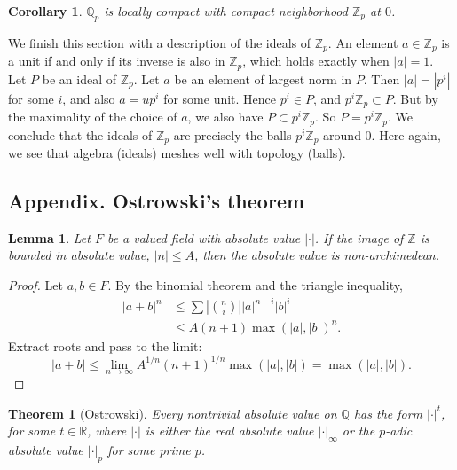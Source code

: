 \documentclass{amsart}
\newcommand{\ring}[1]{\mathbb{#1}}
\newtheorem{theorem}[equation]{Theorem}
\newtheorem{lemma}[equation]{Lemma}
\newtheorem{corollary}[equation]{Corollary}
\def\abs#1{{|#1|}}
\begin{document}
\begin{corollary} $\ring{Q}_p$ is locally compact with compact neighborhood $\ring{Z}_p$
at $0$.
\end{corollary}

We finish this section with a description of the ideals of $\ring{Z}_p$.
An element $a\in\ring{Z}_p$ is a unit if and only if its inverse is also in $\ring{Z}_p$,
which holds exactly when $\abs{a}=1$.   Let $P$ be an ideal of $\ring{Z}_p$.  Let
$a$ be an element of largest norm in $P$.  Then $\abs{a}=\abs{p^i}$ for some $i$, and
also $a = u p^i$ for some unit.  Hence $p^i \in P$, and $p^i\ring{Z}_p\subset P$.  But
by the maximality of the choice of $a$, we also have $P\subset p^i\ring{Z}_p$.  
So $P=p^i\ring{Z}_p$.  We conclude that the ideals of $\ring{Z}_p$ are precisely
the balls $p^i\ring{Z}_p$ around $0$.  Here again, we see that algebra (ideals) meshes
well with topology (balls).

\newpage
\subsection{Appendix. Ostrowski's theorem}

\begin{lemma} Let $F$ be a valued field with absolute value $\abs{\cdot}$.
If the image of $\ring{Z}$ is bounded in absolute value, $\abs{n}\le A$, 
then the absolute
value is non-archimedean.
\end{lemma}

\begin{proof}  Let $a,b\in F$.  By the binomial theorem and the triangle inequality,
\begin{align*}
\abs{a+b}^n &\le \sum \abs{{n\choose{i}}}\abs{a}^{n-i}\abs{b}^i\\
    &\le A (n+1)\max(\abs{a},\abs{b})^n.
\end{align*}
Extract roots and pass to the limit:
\[
\abs{a+b} \le \lim_{n\to\infty} A^{1/n}(n+1)^{1/n} \max(\abs{a},\abs{b}) = \max(\abs{a},\abs{b}).
\]
\end{proof}

\begin{theorem}[Ostrowski]  Every nontrivial absolute value on $\ring{Q}$ has the
form $\abs{\cdot}^t$, for some $t\in\ring{R}$, where $\abs{\cdot}$ is either
the real absolute value $\abs{\cdot}_\infty$ 
or the $p$-adic absolute value $\abs{\cdot}_p$ for some prime $p$.
\end{theorem}
\end{document}
